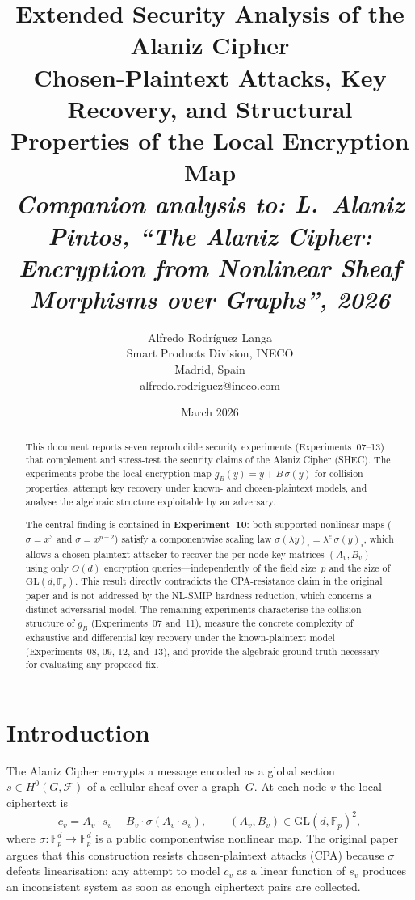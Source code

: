 \documentclass[12pt,a4paper]{article}
\title{%
  \textbf{Extended Security Analysis of the Alaniz Cipher}\\[6pt]
  \large Chosen-Plaintext Attacks, Key Recovery, and Structural\\
  Properties of the Local Encryption Map\\[4pt]
  \normalsize\textit{Companion analysis to: L.~Alaniz Pintos,
  ``The Alaniz Cipher: Encryption from Nonlinear Sheaf Morphisms
  over Graphs'', 2026}
}
\author{%
  Alfredo Rodr\'iguez Langa\\[4pt]
  \normalsize Smart Products Division, INECO\\
  \normalsize Madrid, Spain\\[2pt]
  \small \href{mailto:alfredo.rodriguez@ineco.com}{alfredo.rodriguez@ineco.com}
}
\date{March 2026}
\theoremstyle{definition}
\newcommand{\Fp}{\mathbb{F}_p}
\newcommand{\GL}{\mathrm{GL}}
\newcommand{\Hzero}{H^{0}}
\newcommand{\calF}{\mathcal{F}}
\begin{document}
\maketitle
\thispagestyle{fancy}

\begin{abstract}
This document reports seven reproducible security experiments
(Experiments~07--13) that complement and stress-test the security
claims of the Alaniz Cipher (SHEC). The experiments probe the local
encryption map $g_B(y) = y + B\,\sigma(y)$ for collision properties,
attempt key recovery under known- and chosen-plaintext models, and
analyse the algebraic structure exploitable by an adversary.

The central finding is contained in \textbf{Experiment~10}: both
supported nonlinear maps ($\sigma = x^3$ and $\sigma = x^{p-2}$)
satisfy a componentwise scaling law
$\sigma(\lambda y)_i = \lambda^e\,\sigma(y)_i$, which allows a
chosen-plaintext attacker to recover the per-node key matrices
$(A_v, B_v)$ using only $O(d)$ encryption queries---independently of
the field size~$p$ and the size of $\GL(d,\Fp)$.
This result directly contradicts the CPA-resistance claim in the
original paper and is not addressed by the NL-SMIP hardness
reduction, which concerns a distinct adversarial model.
The remaining experiments characterise the collision structure of
$g_B$ (Experiments~07 and~11), measure the concrete complexity of
exhaustive and differential key recovery under the known-plaintext
model (Experiments~08, 09, 12, and~13), and provide the algebraic
ground-truth necessary for evaluating any proposed fix.
\end{abstract}

\tableofcontents
\newpage

\section{Introduction}

The Alaniz Cipher encrypts a message encoded as a global section
$s \in \Hzero(G, \calF)$ of a cellular sheaf over a graph~$G$.
At each node $v$ the local ciphertext is
\begin{equation}\label{eq:encrypt}
  c_v = A_v \cdot s_v + B_v \cdot \sigma(A_v \cdot s_v),
  \qquad (A_v, B_v) \in \GL(d, \Fp)^2,
\end{equation}
where $\sigma : \Fp^d \to \Fp^d$ is a public componentwise nonlinear
map. The original paper argues that this construction resists
chosen-plaintext attacks (CPA) because $\sigma$ defeats linearisation:
any attempt to model $c_v$ as a linear function of $s_v$ produces an
inconsistent system as soon as enough ciphertext pairs are collected.
\end{document}
